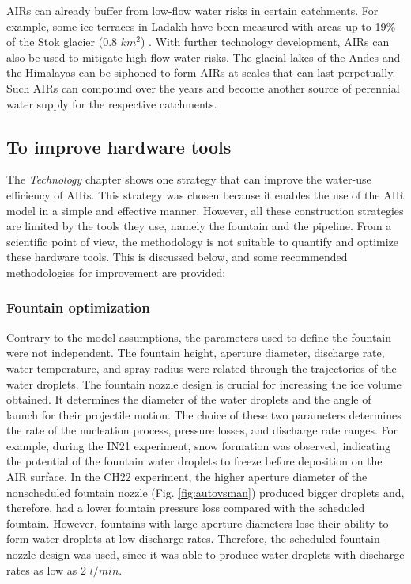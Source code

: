 \ac{AIRs} can already buffer from low-flow water risks in certain catchments. For example, some ice terraces in Ladakh have been measured with areas up to 19\%
of the Stok glacier (0.8 $km^2$) \citet{nusserSociohydrologyArtificialGlaciers2019}. With further technology development, \ac{AIRs} can also be used to mitigate high-flow water risks. The glacial lakes of the Andes and the Himalayas can be siphoned to form \ac{AIRs} at scales that can last
perpetually. Such \ac{AIRs} can compound over the years and become another source of perennial water supply for the
respective catchments.

\subsection{To improve hardware tools}

The \textit{Technology} chapter shows one strategy that can improve the water-use efficiency of \ac{AIRs}. This strategy was chosen because it enables the use of the \ac{AIR} model in a simple and effective manner. However, all these
construction strategies are limited by the tools they use, namely the fountain and the pipeline. From a scientific point of view,
the methodology is not suitable to quantify and optimize these hardware tools. This is discussed below, and some recommended methodologies for improvement are provided:

\subsubsection{Fountain optimization}

Contrary to the model assumptions, the parameters used to define the fountain were not independent. The fountain
height, aperture diameter, discharge rate, water temperature, and spray radius were related through the
trajectories of the water droplets. The fountain nozzle design is crucial for increasing the ice volume
obtained. It determines the diameter of the water droplets and the angle of launch for their projectile motion.
The choice of these two parameters determines the rate of the nucleation process, pressure losses, and discharge
rate ranges. For example, during the IN21 experiment, snow formation was observed, indicating the potential of the fountain
water droplets to freeze before deposition on the \ac{AIR} surface. In the CH22 experiment, the
higher aperture diameter of the nonscheduled fountain nozzle (Fig. \ref{fig:autovsman}) produced bigger droplets
and, therefore, had a lower fountain pressure loss compared with the scheduled fountain. However, fountains
with large aperture diameters lose their ability to form water droplets at low discharge rates. Therefore, the
scheduled fountain nozzle design was used, since it was able to produce water droplets with discharge rates as
low as 2 $l/min$.

